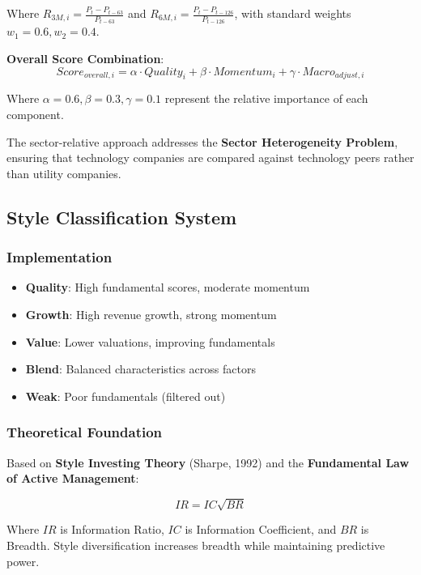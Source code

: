 \documentclass[12pt,a4paper]{article}
\begin{document}
Where $R_{3M,i} = \frac{P_{t} - P_{t-63}}{P_{t-63}}$ and $R_{6M,i} = \frac{P_{t} - P_{t-126}}{P_{t-126}}$, with standard weights $w_1 = 0.6, w_2 = 0.4$.

\textbf{Overall Score Combination}:
\begin{equation}
Score_{overall,i} = \alpha \cdot Quality_i + \beta \cdot Momentum_i + \gamma \cdot Macro_{adjust,i}
\end{equation}

Where $\alpha = 0.6, \beta = 0.3, \gamma = 0.1$ represent the relative importance of each component.

The sector-relative approach addresses the \textbf{Sector Heterogeneity Problem}, ensuring that technology companies are compared against technology peers rather than utility companies.

\subsection{Style Classification System}

\subsubsection{Implementation}
\begin{itemize}
    \item \textbf{Quality}: High fundamental scores, moderate momentum
    \item \textbf{Growth}: High revenue growth, strong momentum
    \item \textbf{Value}: Lower valuations, improving fundamentals
    \item \textbf{Blend}: Balanced characteristics across factors
    \item \textbf{Weak}: Poor fundamentals (filtered out)
\end{itemize}

\subsubsection{Theoretical Foundation}
Based on \textbf{Style Investing Theory} (Sharpe, 1992) and the \textbf{Fundamental Law of Active Management}:

\begin{equation}
IR = IC \sqrt{BR}
\end{equation}

Where $IR$ is Information Ratio, $IC$ is Information Coefficient, and $BR$ is Breadth. Style diversification increases breadth while maintaining predictive power.
\end{document}
